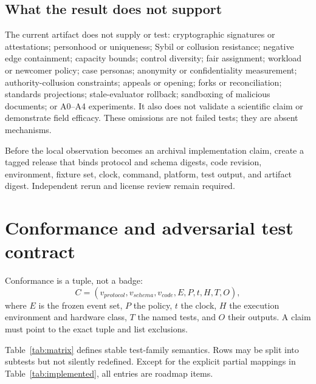 \documentclass[11pt]{article}
\begin{document}
\subsection{What the result does not support}

The current artifact does not supply or test: cryptographic signatures or
attestations; personhood or uniqueness; Sybil or collusion resistance; negative
edge containment; capacity bounds; control diversity; fair assignment; workload or
newcomer policy; case personas; anonymity or confidentiality measurement;
authority-collusion constraints; appeals or opening; forks or reconciliation;
standards projections; stale-evaluator rollback; sandboxing of malicious documents;
or A0--A4 experiments. It also does not validate a scientific claim or demonstrate
field efficacy. These omissions are not failed tests; they are absent mechanisms.

\begin{evidencegate}
Before the local observation becomes an archival implementation claim, create a
tagged release that binds protocol and schema digests, code revision, environment,
fixture set, clock, command, platform, test output, and artifact digest. Independent
rerun and license review remain required.
\end{evidencegate}

\section{Conformance and adversarial test contract}
\label{sec:tests}

Conformance is a tuple, not a badge:
\begin{equation}
C=(v_{protocol},v_{schema},v_{code},E,P,t,H,T,O),
\end{equation}
where $E$ is the frozen event set, $P$ the policy, $t$ the clock, $H$ the execution
environment and hardware class, $T$ the named tests, and $O$ their outputs. A claim
must point to the exact tuple and list exclusions.

Table~\ref{tab:matrix} defines stable test-family semantics. Rows may be split into
subtests but not silently redefined. Except for the explicit partial mappings in
Table~\ref{tab:implemented}, all entries are roadmap items.
\end{document}
